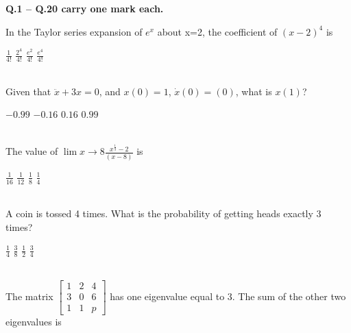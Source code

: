\documentclass[addpoints,11pt]{exam}
\begin{document}
\newpage

\large\textbf{Q.1 -- Q.20 carry one mark each.}\\
\begin{questions}

    \question In the Taylor series expansion of $e^x$ about x=2, the coefficient of $(x-2)^4$ is\\

    \begin{oneparchoices}
        \choice $\frac{1}{4!}$
        \choice $\frac{2^4}{4!}$
        \choice $\frac{e^2}{4!}$
        \choice $\frac{e^4}{4!}$
    \end{oneparchoices}\\

    \question Given that $\ddot{x} + 3x = 0$, and $x(0)=1$, $\dot{x}(0)=(0)$, what is $x(1)$?\\

    \begin{oneparchoices}
        \choice $-0.99$
        \choice $-0.16$
        \choice $0.16$
        \choice $0.99$
    \end{oneparchoices}\\

    \question The value of $\lim{x\rightarrow8} \frac{x^{\frac{1}{3}}-2}{(x-8)}$ is\\

    \begin{oneparchoices}
        \choice $\frac{1}{16}$
        \choice $\frac{1}{12}$
        \choice $\frac{1}{8}$
        \choice $\frac{1}{4}$
    \end{oneparchoices}\\

    \question A coin is tossed 4 times. What is the probability of getting heads exactly 3 times?\\

    \begin{oneparchoices}
        \choice $\frac{1}{4}$
        \choice $\frac{3}{8}$
        \choice $\frac{1}{2}$
        \choice $\frac{3}{4}$
    \end{oneparchoices}\\

    \question The matrix $\begin{bmatrix}
            1 & 2 & 4 \\
            3 & 0 & 6 \\
            1 & 1 & p
        \end{bmatrix}$ has one eigenvalue equal to 3. The sum of the other two eigenvalues is\\


\end{questions}
\end{document}
